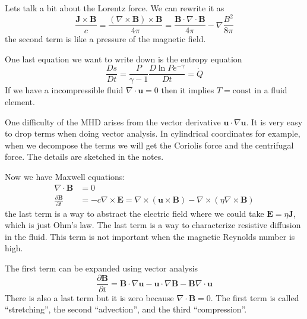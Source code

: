 \documentclass[letterpaper, 11pt]{article}
\numberwithin{equation}{section}
\numberwithin{figure}{section}
\begin{document}
Lets talk a bit about the Lorentz force. We can rewrite it as
\begin{equation}
  \label{eq:5}
  \frac{\mathbf{J}\times \mathbf{B}}{c} = \frac{(\nabla\times \mathbf{B}) \times \mathbf{B}}{4\pi} = \frac{\mathbf{B}\cdot \nabla\cdot \mathbf{B}}{4\pi} - \nabla \frac{B^2}{8\pi}
\end{equation}
the second term is like a pressure of the magnetic field.

One last equation we want to write down is the entropy equation
\begin{equation}
  \label{eq:6}
  \frac{Ds}{Dt} = \frac{P}{\gamma - 1}\frac{D \ln P e^{-\gamma}}{D t} = \dot{Q}
\end{equation}
If we have a incompressible fluid $\nabla\cdot \mathbf{u} = 0$ then it implies
$T = \text{const}$ in a fluid element.

One difficulty of the MHD arises from the vector derivative $\mathbf{u}\cdot
\nabla \mathbf{u}$. It is very easy to drop terms when doing vector analysis. In
cylindrical coordinates for example, when we decompose the terms we will get the
Coriolis force and the centrifugal force. The details are sketched in the notes.

Now we have Maxwell equations:
\begin{align}
  \nabla\cdot \mathbf{B} & = 0 \\
  \frac{\partial \mathbf{B}}{\partial t} &= -c\nabla\times \mathbf{E} = \nabla \times (\mathbf{u}\times \mathbf{B}) - \nabla\times(\eta \nabla\times \mathbf{B})
\end{align}
the last term is a way to abstract the electric field where we could take
$\mathbf{E} = \eta \mathbf{J}$, which is just Ohm's law. The last term is a way
to characterize resistive diffusion in the fluid. This term is not important
when the magnetic Reynolds number is high.

The first term can be expanded using vector analysis
\begin{equation}
  \label{eq:7}
  \frac{\partial \mathbf{B}}{\partial t} = \mathbf{B}\cdot \nabla \mathbf{u} - \mathbf{u}\cdot \nabla \mathbf{B} - \mathbf{B}\nabla\cdot \mathbf{u}
\end{equation}
There is also a last term but it is zero because $\nabla\cdot \mathbf{B} = 0$.
The first term is called ``stretching'', the second ``advection'', and the third
``compression''.
\end{document}
